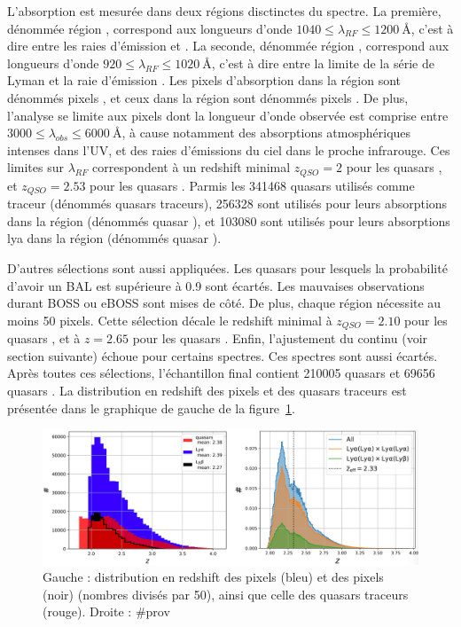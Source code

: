 \documentclass[11pt, twoside, a4paper, openright]{report}
\begin{document}
L'absorption \lya{} est mesurée dans deux régions disctinctes du spectre. La première, dénommée région \lya{}, correspond aux longueurs d'onde $\num{1040} \leq \lambda_{RF} \leq \SI{1200}{\angstrom}$, c'est à dire entre les raies d'émission \lyb{} et \lya{}. La seconde, dénommée région \lyb{}, correspond aux longueurs d'onde $\num{920} \leq \lambda_{RF} \leq \SI{1020}{\angstrom}$, c'est à dire entre la limite de la série de Lyman et la raie d'émission \lyb{}. Les pixels d'absorption \lya{} dans la région \lya{} sont dénommés pixels \lyalya{}, et ceux dans la région \lyb{} sont dénommés pixels \lyalyb{}.
De plus, l'analyse se limite aux pixels dont la longueur d'onde observée est comprise entre $\num{3000} \leq \lambda_{obs} \leq \SI{6000}{\angstrom}$, à cause notamment des absorptions atmosphériques intenses dans l'UV, et des raies d'émissions du ciel dans le proche infrarouge. Ces limites sur $\lambda_{RF}$ correspondent à un redshift minimal $z_{QSO} = 2$ pour les quasars \lya{}, et $z_{QSO} = 2.53$ pour les quasars \lyb{}. Parmis les \num{341468} quasars utilisés comme traceur (dénommés quasars traceurs), \num{256328} sont utilisés pour leurs absorptions \lya{} dans la région \lya (dénommés quasar \lya{}), et \num{103080} sont utilisés pour leurs absorptions lya{} dans la région \lyb{} (dénommés quasar \lyb{}).

D'autres sélections sont aussi appliquées. Les quasars pour lesquels la probabilité d'avoir un BAL est supérieure à 0.9 sont écartés. Les mauvaises observations durant BOSS ou eBOSS sont mises de côté. De plus, chaque région nécessite au moins 50 pixels. Cette sélection décale le redshift minimal à $z_{QSO} = 2.10$ pour les quasars \lya{}, et à $z = 2.65$ pour les quasars \lyb{}. Enfin, l'ajustement du continu (voir section suivante) échoue pour certains spectres. Ces spectres sont aussi écartés.
Après toutes ces sélections, l'échantillon final contient \num{210005} quasars \lya{} et \num{69656} quasars \lyb{}.
La distribution en redshift des pixels et des quasars traceurs est présentée dans le graphique de gauche de la figure~\ref{fig:pixel_number}.
\begin{figure}
  \centering
  \includegraphics[scale=0.4]{pixel_number}
  \caption{Gauche : distribution en redshift des pixels \lyalya{} (bleu) et des pixels\lyalyb{} (noir) (nombres divisés par 50), ainsi que celle des quasars traceurs (rouge). Droite : \#prov}
  \label{fig:pixel_number}
\end{figure}





\end{document}

